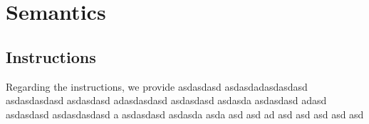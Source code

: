 \section{Semantics}
\label{sec:semantics}

\subsection{Instructions}
Regarding the instructions, we provide asdasdasd asdasdadasdasdasd asdasdasdasd asdasdasd adasdasdasd asdasdasd asdasda asdasdasd adasd asdasdasd asdasdasdasd a asdasdasd asdasda asda asd asd ad asd asd asd asd asd

